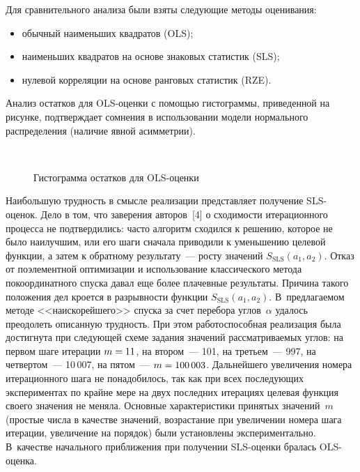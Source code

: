 \begin{multicols}{2}
     Для сравнительного анализа были взяты следующие методы оценивания:
     \begin{itemize}
\item обычный наименьших квадратов (OLS);\\[-9pt]
\item наименьших квадратов на основе знаковых статистик 
(SLS);\\[-9pt]
\item нулевой корреляции на основе ранговых статистик (RZE).
\end{itemize}

Анализ остатков для OLS-оцен\-ки с помощью гис\-то\-грам\-мы,
приведенной на рисунке, под\-тверж\-да\-ет
сомнения в использовании модели
нормального распределения (наличие явной асимметрии).

      \begin{figure*} %
      \vspace*{1pt}
\begin{center}
\mbox{%
\epsfxsize=140mm
}
\vspace*{4pt}

\noindent
      {\small Гистограмма остатков для OLS-оценки}
      \end{center}
      \end{figure*}

     Наибольшую трудность в смысле реализации представляет получение
SLS-оце\-нок. Дело в том, что заверения авторов~[4] о сходимости
итерационного процесса не подтвердились: часто алгоритм сходился к
решению, которое не было наилучшим, или его шаги сначала приводили к
уменьшению целевой функции, а затем к обратному результату~--- росту
значений $S_{\mathrm{SLS}}(a_1,a_2)$. Отказ от поэлементной оптимизации и
использование классического метода покоординатного спуска давал еще более
плачевные результаты. Причина такого положения дел кроется в разрывности
функции $S_{\mathrm{SLS}}(a_1,a_2)$. В~предлагаемом методе <<наискорейшего>>
спуска за счет перебора углов~$\alpha$ удалось преодолеть описанную
трудность. При этом работоспособная реа\-лизация была достигнута при
следующей схеме \mbox{задания} значений рассматриваемых углов: на первом шаге
итерации $m\hm= 11$, на втором~--- 101, на \mbox{третьем}~--- 997, на четвертом~---
10\,007, на пятом~--- $m\hm= 100\,003$. Дальнейшего увеличения номера
итерационного шага не понадобилось, так как при всех последующих
экспериментах по крайне мере на двух последних итерациях целевая функция
своего значения не меняла. Основные характеристики принятых значений~$m$
(простые числа в качестве значений, возрастание при увеличении номера шага
итерации, увеличение на порядок) были уста\-нов\-ле\-ны экспериментально.
В~качестве начального приближения при получении SLS-оцен\-ки бралась
OLS-оценка.


\end{multicols}
